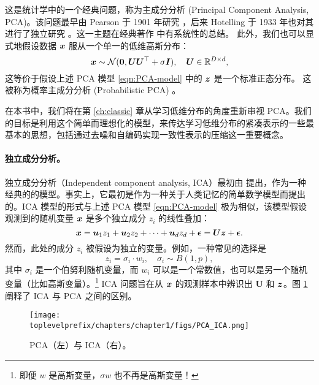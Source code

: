 \documentclass[../../book-main.tex]{subfiles}
\begin{document}
这是统计学中的一个经典问题，称为主成分分析 (Principal Component Analysis, PCA)。该问题最早由 Pearson 于 1901 年研究 \cite{Pearson1901}，后来 Hotelling 于 1933 年也对其进行了独立研究 \cite{Hotelling1933}。这一主题在经典著作 \cite{Jolliffe1986,JolliffeI2002} 中有系统性的总结。
此外，我们也可以显式地假设数据 $\bm{x}$ 服从一个单一的低维高斯分布：
\begin{equation}
    \bm{x} \sim \mathcal{N}(\boldsymbol{0}, \boldsymbol{U}\boldsymbol{U}^\top + \sigma \bm{I}), \quad \boldsymbol{U} \in \mathbb{R}^{D\times d},
\end{equation}
这等价于假设上述 PCA 模型 \eqref{eqn:PCA-model} 中的 $\bm{z}$ 是一个标准正态分布。
这被称为概率主成分分析 (Probabilistic PCA) \cite{TippingM1999}。

在本书中，我们将在第 \ref{ch:classic} 章从学习低维分布的角度重新审视 PCA。我们的目标是利用这个简单而理想化的模型，来传达学习低维分布的紧凑表示的一些最基本的思想，包括通过去噪和自编码实现一致性表示的压缩这一重要概念。

\paragraph{独立成分分析。}

独立成分分析（Independent component analysis, ICA）最初由 \cite{Ans-1985} 提出，作为一种经典的{}的模型。事实上，它最初是作为一种关于人类记忆的简单数学模型而提出的。ICA 模型的形式与上述 PCA 模型 \eqref{eqn:PCA-model} 极为相似，该模型假设观测到的随机变量 $\bm{x}$ 是多个独立成分 $z_i$ 的线性叠加：
\begin{equation}
    \bm{x} = \boldsymbol{u}_1 z_1 + \boldsymbol{u}_2 z_2 + \cdots + \boldsymbol{u}_d z_d  + \boldsymbol{\epsilon} =  \boldsymbol{U} \bm{z} + \boldsymbol{\epsilon}.
    \label{eqn:ICA-model}
\end{equation}
然而，此处的成分 $z_i$ 被假设为独立的{}变量。例如，一种常见的选择是
\begin{equation}
    z_i = \sigma_i \cdot w_i, \quad \sigma_i \sim B(1,p),
    \label{eqn:ICA-modes}
\end{equation}
其中 $\sigma_i$ 是一个伯努利随机变量，而 $w_i$ 可以是一个常数值，也可以是另一个随机变量（比如高斯变量）。\footnote{即便 $w$ 是高斯变量，$\sigma w$ 也不再是高斯变量！} ICA 问题旨在从 $\bm{x}$ 的观测样本中辨识出 $\boldsymbol{U}$ 和 $\bm{z}$。图 \ref{fig:ICA-PCA} 阐释了 ICA 与 PCA 之间的区别。

\begin{figure}
    \centering
    \texttt{[image: \\toplevelprefix/chapters/chapter1/figs/PCA\_ICA.png]}
    \caption{PCA（左）与 ICA（右）。}
    \label{fig:ICA-PCA}
\end{figure}
\end{document}
